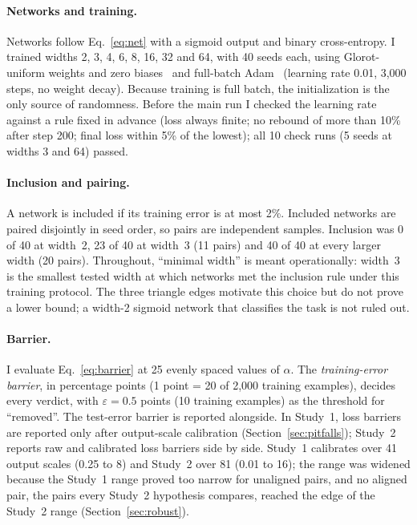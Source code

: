 \documentclass[11pt]{article}
\newcommand{\eps}{\varepsilon}
\begin{document}
\paragraph{Networks and training.} Networks follow Eq.~\eqref{eq:net} with a sigmoid output and binary cross-entropy. I trained widths 2, 3, 4, 6, 8, 16, 32 and 64, with 40 seeds each, using Glorot-uniform weights and zero biases~\cite{glorot2010understanding} and full-batch Adam~\cite{kingma2015adam} (learning rate 0.01, 3{,}000 steps, no weight decay). Because training is full batch, the initialization is the only source of randomness. Before the main run I checked the learning rate against a rule fixed in advance (loss always finite; no rebound of more than 10\% after step 200; final loss within 5\% of the lowest); all 10 check runs (5 seeds at widths 3 and 64) passed.

\paragraph{Inclusion and pairing.} A network is included if its training error is at most 2\%. Included networks are paired disjointly in seed order, so pairs are independent samples. Inclusion was 0 of 40 at width~2, 23 of 40 at width~3 (11 pairs) and 40 of 40 at every larger width (20 pairs). Throughout, ``minimal width'' is meant operationally: width~3 is the smallest tested width at which networks met the inclusion rule under this training protocol. The three triangle edges motivate this choice but do not prove a lower bound; a width-2 sigmoid network that classifies the task is not ruled out.

\paragraph{Barrier.} I evaluate Eq.~\eqref{eq:barrier} at 25 evenly spaced values of $\alpha$. The \emph{training-error barrier}, in percentage points (1 point = 20 of 2{,}000 training examples), decides every verdict, with $\eps = 0.5$ points (10 training examples) as the threshold for ``removed''. The test-error barrier is reported alongside. In Study~1, loss barriers are reported only after output-scale calibration (Section~\ref{sec:pitfalls}); Study~2 reports raw and calibrated loss barriers side by side. Study~1 calibrates over 41 output scales (0.25 to 8) and Study~2 over 81 (0.01 to 16); the range was widened because the Study~1 range proved too narrow for unaligned pairs, and no aligned pair, the pairs every Study~2 hypothesis compares, reached the edge of the Study~2 range (Section~\ref{sec:robust}).
\end{document}
